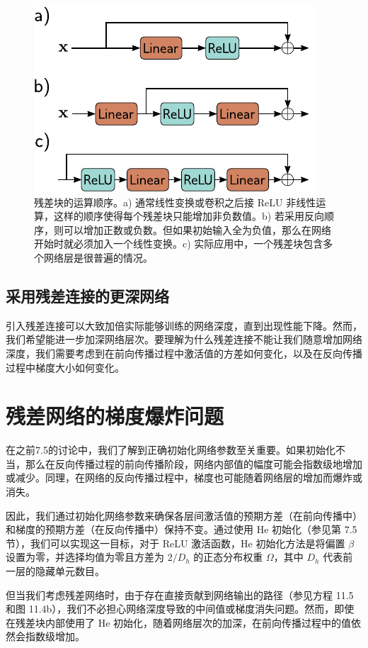 \documentclass[lang=cn,newtx,10pt,scheme=chinese]{elegantbook}
\begin{document}
\begin{figure}[ht!]
\centering
\includegraphics[width=0.7\linewidth]{PDFFigures/UDLChap11PDF/ResidualOrder.pdf}
\caption{残差块的运算顺序。a) 通常线性变换或卷积之后接 ReLU 非线性运算，这样的顺序使得每个残差块只能增加非负数值。b) 若采用反向顺序，则可以增加正数或负数。但如果初始输入全为负值，那么在网络开始时就必须加入一个线性变换。c) 实际应用中，一个残差块包含多个网络层是很普遍的情况。}
\end{figure}


\subsection{采用残差连接的更深网络}
引入残差连接可以大致加倍实际能够训练的网络深度，直到出现性能下降。然而，我们希望能进一步加深网络层次。要理解为什么残差连接不能让我们随意增加网络深度，我们需要考虑到在前向传播过程中激活值的方差如何变化，以及在反向传播过程中梯度大小如何变化。

\section{残差网络的梯度爆炸问题}
在之前7.5的讨论中，我们了解到正确初始化网络参数至关重要。如果初始化不当，那么在反向传播过程的前向传播阶段，网络内部值的幅度可能会指数级地增加或减少。同理，在网络的反向传播过程中，梯度也可能随着网络层的增加而爆炸或消失。

因此，我们通过初始化网络参数来确保各层间激活值的预期方差（在前向传播中）和梯度的预期方差（在反向传播中）保持不变。通过使用 He 初始化（参见第 7.5 节），我们可以实现这一目标，对于 ReLU 激活函数，He 初始化方法是将偏置 \(\beta\) 设置为零，并选择均值为零且方差为 \(2/D_h\) 的正态分布权重 \(\Omega\)，其中 \(D_h\) 代表前一层的隐藏单元数目。

但当我们考虑残差网络时，由于存在直接贡献到网络输出的路径（参见方程 11.5 和图 11.4b），我们不必担心网络深度导致的中间值或梯度消失问题。然而，即使在残差块内部使用了 He 初始化，随着网络层次的加深，在前向传播过程中的值依然会指数级增加。
\end{document}
